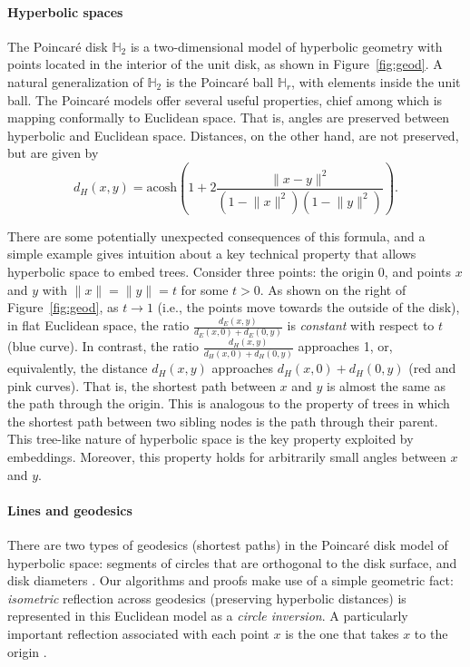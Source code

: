 \paragraph*{Hyperbolic spaces} The Poincar\'{e} disk $\mathbb{H}_2$ is a
two-dimensional model of hyperbolic geometry with points located in
the interior of the unit disk, as shown in Figure~\ref{fig:geod}. A
natural generalization of $\mathbb{H}_2$ is the Poincar\'{e} ball
$\mathbb{H}_r$, with elements inside the unit ball. The Poincar\'{e}
models offer several useful properties, chief among which is mapping
conformally to Euclidean space. That is, angles are preserved between
hyperbolic and Euclidean space. Distances, on the other hand, are not
preserved, but are given by
\[d_{H}(x,y) = \text{acosh} \left( 1 + 2 \frac{\lVert { x}-{ y} \rVert^2}{(1-\lVert { x}\rVert^2)(1-\lVert { y}\rVert^2)} \right).\]

There are some potentially unexpected consequences of this formula,
and a simple example gives intuition about a key technical property
that allows hyperbolic space to embed trees. Consider three
points: the origin $0$, and points $x$ and $y$ with $\|x\|=\|y\| = t$ for some
$t > 0$. As shown on the right of Figure~\ref{fig:geod}, as
$t\rightarrow1$ (i.e., the points move towards the outside of the
disk), in flat Euclidean space, the ratio
$\frac{d_E(x,y)}{d_E(x,0)+d_E(0,y)}$ is {\em constant} with respect to
$t$ (blue curve). In contrast, the ratio $\frac{d_H(x,y)}{d_H(x,0)+d_H(0,y)}$ approaches 1, or, equivalently, the distance $d_H(x,y)$ approaches
$d_H(x,0)+d_H(0,y)$ (red and pink curves). That is, the shortest path between $x$ and $y$ is
almost the same as the path through the origin. This is analogous to the property of trees
in which the shortest path between two sibling nodes is the path through their parent.
This tree-like nature of hyperbolic space is the key property exploited by embeddings. Moreover,
this property holds for arbitrarily small angles between $x$ and
$y$.

\paragraph*{Lines and geodesics}  There are two types of geodesics (shortest
paths) in the Poincar{\'e} disk model of hyperbolic space: segments of circles that are orthogonal to
the disk surface, and disk diameters \cite{GeometryText}. Our algorithms and
proofs make use of a simple geometric fact: {\em isometric} reflection across geodesics
(preserving hyperbolic distances) is represented in this Euclidean model as a \emph{circle inversion}.
A particularly important reflection associated with each point $x$ is the one that takes $x$ to the
origin \citep[p.~268]{GeometryText}.

